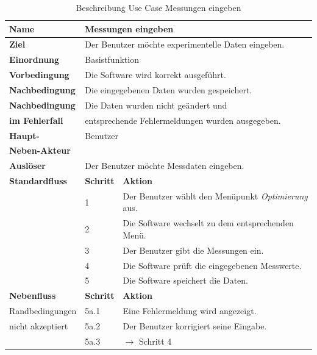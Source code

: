 \begin{table} [H]
	\centering
	\begin{tabular}{|l|l|l|}
		\hline
		\textbf{Name} 			& \multicolumn{2}{|l|}{Messungen eingeben}  \\
		\hline
		\textbf{Ziel} 			& \multicolumn{2}{|l|}{Der Benutzer möchte experimentelle Daten eingeben. }\\ 
		\hline
		\textbf{Einordnung}		& \multicolumn{2}{|l|}{Basistfunktion}\\
		\hline
		\textbf{Vorbedingung}	& \multicolumn{2}{|l|}{Die Software wird korrekt ausgeführt.} \\
		\hline
		\textbf{Nachbedingung}	& \multicolumn{2}{|l|}{Die eingegebenen Daten wurden gespeichert.}\\
		\hline
		\textbf{Nachbedingung} 	& \multicolumn{2}{|l|}{Die Daten wurden nicht geändert und}\\
		\textbf{im Fehlerfall}	& \multicolumn{2}{|l|}{entsprechende Fehlermeldungen wurden ausgegeben.}\\
		\hline
		\textbf{Haupt-} 		& \multicolumn{2}{|l|}{Benutzer}\\
		\textbf{Neben-Akteur}	& \multicolumn{2}{|l|}{	}			\\
		\hline
		\textbf{Auslöser} 		& \multicolumn{2}{|l|}{Der Benutzer möchte Messdaten eingeben.} \\
		\hline 
		\textbf{Standardfluss} & \textbf{Schritt} & \textbf{Aktion} \\
		\hline
		&	1	& Der Benutzer wählt den Menüpunkt \emph{Optimierung} aus. \\
		\cline{2-3}
		&	2	& Die Software wechselt zu dem entsprechenden Menü.\\
		\cline{2-3}
		&	3	& Der Benutzer gibt die Messungen ein.\\
		\cline{2-3}
		&	4	& Die Software prüft die eingegebenen Messwerte.\\
		\cline{2-3}
		&	5	& Die Software speichert die Daten.\\
		\hline
		\textbf{Nebenfluss} & \textbf{Schritt} & \textbf{Aktion}\\
		\hline
		Randbedingungen  & 5a.1 & Eine Fehlermeldung wird angezeigt.\\
		\cline{2-3}
		nicht akzeptiert 	& 5a.2	& Der Benutzer korrigiert seine Eingabe.\\
		\cline{2-3}
		& 5a.3 	& $\rightarrow$ Schritt 4\\
		\hline
	\end{tabular}
	\caption{Beschreibung Use Case Messungen eingeben}
	\label{Beschreibung Use Case Messungen eingeben}
\end{table}

